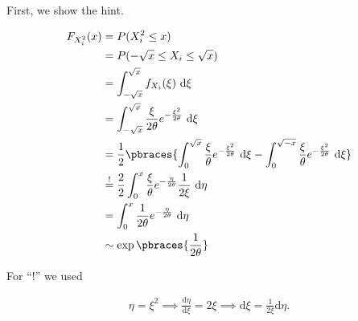 \begin{solution}

First, we show the hint.

\begin{align*}
    F_{X_i^2}(x)
    & =
    P(X_i^2 \leq x) \\
    & =
    P(-\sqrt x \leq X_i \leq \sqrt x) \\
    & =
    \int_{-\sqrt x}^{\sqrt x}
        f_{X_i}(\xi)
        ~ \mathrm d \xi \\
    & =
    \int_{-\sqrt x}^{\sqrt x}
        \frac{\xi}{2 \theta}
        e^{-\frac{\xi^2}{2 \theta}}
        ~ \mathrm d \xi \\
    & =
    \frac{1}{2}
    \pbraces
    {
        \int_0^{\sqrt x}
            \frac{\xi}{\theta}
            e^{-\frac{\xi^2}{2 \theta}}
            ~ \mathrm d \xi
        -
        \int_0^{\sqrt{-x}}
            \frac{\xi}{\theta}
            e^{-\frac{\xi^2}{2 \theta}}
            ~ \mathrm d \xi
    } \\
    & \stackrel{!}{=}
    \frac{2}{2}
    \int_0^x
        \frac{\xi}{\theta}
        e^{-\frac{\eta}{2 \theta}}
        \frac{1}{2 \xi}
        ~ \mathrm d \eta \\
    & =
    \int_0^x
        \frac{1}{2 \theta}
        e^{-\frac{\eta}{2 \theta}}
        ~ \mathrm d \eta \\
    & \sim
    \exp \pbraces{\frac{1}{2 \theta}}
\end{align*}

For \enquote ! we used

\begin{align*}
    \eta = \xi^2
    \implies
    \frac{\mathrm d \eta}{\mathrm d \xi} = 2 \xi
    \implies
    \mathrm d \xi = \frac{1}{2 \xi} \mathrm d \eta.
\end{align*}


\end{solution}
